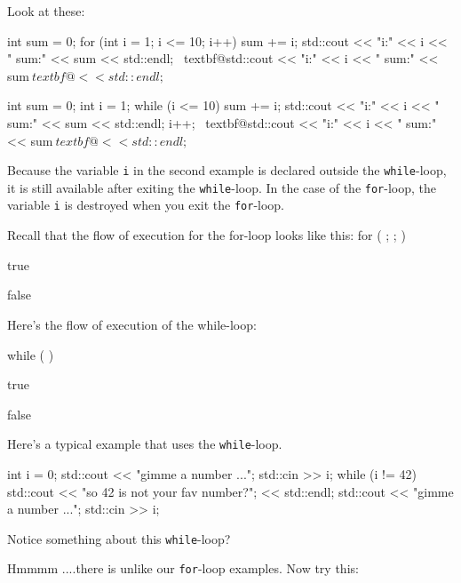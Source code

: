 Look at these:
\begin{console}[commandchars=\~\@\$]
int sum = 0;
for (int i = 1; i <= 10; i++)
{   
    sum += i;
    std::cout << "i:" << i << " sum:" << sum
              << std::endl;
}
~textbf@std::cout << "i:" << i << " sum:" << sum$
          ~textbf@<< std::endl;$
\end{console}
\begin{console}[commandchars=\~\@\$]
int sum = 0;
int i = 1;
while (i <= 10)
{     
      sum += i;
      std::cout << "i:" << i << " sum:" << sum <<
      std::endl;
      i++;
}
~textbf@std::cout << "i:" << i << " sum:" << sum$
          ~textbf@<< std::endl;$
\end{console}
Because the variable \texttt{i} in the second example is declared outside
the \texttt{while}-loop, it is still available after exiting the
\texttt{while}-loop. In the case of the \texttt{for}-loop, the variable
\texttt{i} is destroyed when you exit the \texttt{for}-loop.

\newpage{}

Recall that the flow of execution for the for-loop looks like this:
for ( ; ; )

true

false

Here's the flow of execution of the while-loop:

while ( )

true

false

\newpage{}

Here's a typical example that uses the \texttt{while}-loop.
\begin{console}
int i = 0;
std::cout << "gimme a number ...";
std::cin >> i;
while (i != 42)
{     
      std::cout << "so 42 is not your fav number?";
                << std::endl;
      std::cout << "gimme a number ...";
      std::cin >> i;
}
\end{console}

Notice something about this \texttt{while}-loop?

Hmmmm ....there is  unlike our \texttt{for}-loop examples. Now try this:


